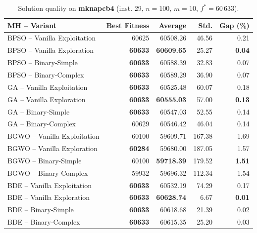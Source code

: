 \begin{table}[htbp]
  \centering
  \small
  \caption{Solution quality on \textbf{mknapcb4} (inst. 29, $n=100$, $m=10$, $f^*=60\,633$).}
  \label{tab:calidad_mknapcb4_29}
  \begin{tabular}{lrrrr}
    \toprule
    \textbf{MH -- Variant} &
    \textbf{Best Fitness} &
    \textbf{Average} &
    \textbf{Std.} &
    \textbf{Gap (\%)} \\
    \midrule
    BPSO -- Vanilla Exploitation &          60625 &         60508.26 &  46.56 &         0.21 \\
    BPSO -- Vanilla Exploration  & \textbf{60633} & \textbf{60609.65} &  25.27 & \textbf{0.04} \\
    BPSO -- Binary-Simple        & \textbf{60633} &         60588.39 &  32.83 &         0.07 \\
    BPSO -- Binary-Complex       & \textbf{60633} &         60589.29 &  36.90 &         0.07 \\
    \midrule
    GA -- Vanilla Exploitation   & \textbf{60633} &         60525.48 &  60.07 &         0.18 \\
    GA -- Vanilla Exploration    & \textbf{60633} & \textbf{60555.03} &  57.00 & \textbf{0.13} \\
    GA -- Binary-Simple          & \textbf{60633} &         60547.03 &  52.55 &         0.14 \\
    GA -- Binary-Complex         &          60629 &         60546.42 &  46.04 &         0.14 \\
    \midrule
    BGWO -- Vanilla Exploitation &          60100 &         59609.71 & 167.38 &         1.69 \\
    BGWO -- Vanilla Exploration  & \textbf{60284} &         59680.00 & 187.05 &         1.57 \\
    BGWO -- Binary-Simple        &          60100 & \textbf{59718.39} & 179.52 & \textbf{1.51} \\
    BGWO -- Binary-Complex       &          59932 &         59696.32 & 112.34 &         1.54 \\
    \midrule
    BDE -- Vanilla Exploitation  & \textbf{60633} &         60532.19 &  74.29 &         0.17 \\
    BDE -- Vanilla Exploration   & \textbf{60633} & \textbf{60628.74} &   6.67 & \textbf{0.01} \\
    BDE -- Binary-Simple         & \textbf{60633} &         60618.68 &  21.39 &         0.02 \\
    BDE -- Binary-Complex        & \textbf{60633} &         60615.35 &  25.20 &         0.03 \\
    \bottomrule
  \end{tabular}
\end{table}
